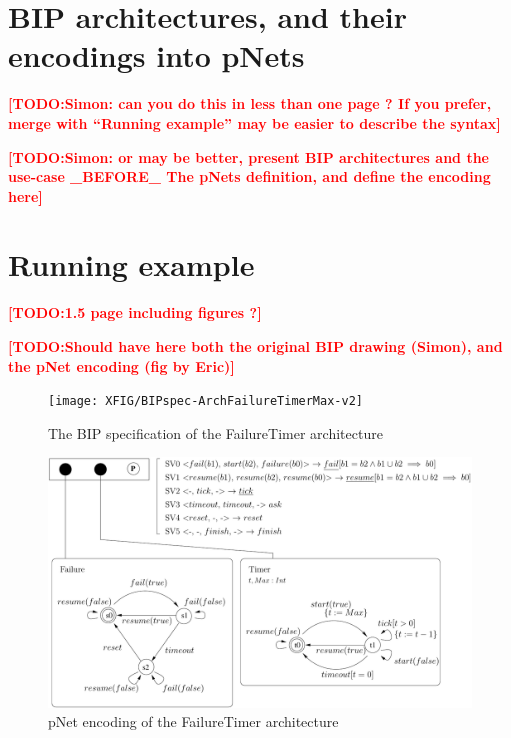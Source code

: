 \documentclass{lncs/llncs}
\newcommand{\TODO}[1]{\textcolor{red}{\textbf{[TODO:#1]}}}
\begin{document}
\section{BIP architectures, and their encodings into pNets}
\label{section:BIParchitectures}
\TODO{Simon: can you do this in less than one page ? If you prefer,
  merge with ``Running example'' may be easier to describe the syntax}

\TODO{Simon: or may be better, present BIP architectures and the use-case \_BEFORE\_ The pNets definition, and define the encoding here}

\section{Running example}
\label{section:FailureTimerMax}
\TODO{1.5 page including figures ?}


\TODO{Should have here both the original BIP drawing (Simon), and the
  pNet encoding (fig by Eric)}


 \begin{figure}[t]
   \centering
   \texttt{[image: XFIG/BIPspec-ArchFailureTimerMax-v2]}
   \caption{The BIP specification of the FailureTimer architecture}
   \label{schema:ArchFailure:BIP}
 \end{figure}
%
%
 \begin{figure}[t]
   \centering
   \includegraphics[width=\columnwidth]{XFIG/FailureTimerPNET}
   \caption{pNet encoding of the FailureTimer architecture}
   \label{schema:ArchFailure:pNet}
 \end{figure}
\end{document}
